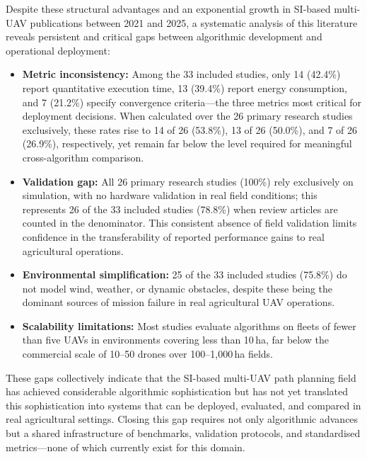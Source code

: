 \documentclass[review,3p,times]{elsarticle}
\begin{document}
Despite these structural advantages and an exponential growth in SI-based multi-UAV publications between 2021 and 2025, a systematic analysis of this literature reveals persistent and critical gaps between algorithmic development and operational deployment:

\begin{itemize}
  \item \textbf{Metric inconsistency:} Among the 33 included studies, only 14 (42.4\%)
  report quantitative execution time, 13 (39.4\%) report energy consumption, and
  7 (21.2\%) specify convergence criteria---the three metrics most critical for
  deployment decisions. When calculated over the 26 primary research studies
  exclusively, these rates rise to 14 of 26 (53.8\%), 13 of 26 (50.0\%), and
  7 of 26 (26.9\%), respectively, yet remain far below the level required for
  meaningful cross-algorithm comparison.

  \item \textbf{Validation gap:} All 26 primary research studies (100\%) rely
  exclusively on simulation, with no hardware validation in real field conditions;
  this represents 26 of the 33 included studies (78.8\%) when review articles are
  counted in the denominator. This consistent absence of field validation limits
  confidence in the transferability of reported performance gains to real agricultural
  operations.

  \item \textbf{Environmental simplification:} 25 of the 33 included studies (75.8\%)
  do not model wind, weather, or dynamic obstacles, despite these being the dominant
  sources of mission failure in real agricultural UAV operations.

  \item \textbf{Scalability limitations:} Most studies evaluate algorithms on fleets
  of fewer than five UAVs in environments covering less than 10\,ha, far below the
  commercial scale of 10--50 drones over 100--1,000\,ha fields.
\end{itemize}

These gaps collectively indicate that the SI-based multi-UAV path planning field has achieved considerable algorithmic sophistication but has not yet translated this sophistication into systems that can be deployed, evaluated, and compared in real agricultural settings. Closing this gap requires not only algorithmic advances but a shared infrastructure of benchmarks, validation protocols, and standardised metrics---none of which currently exist for this domain.
\end{document}
